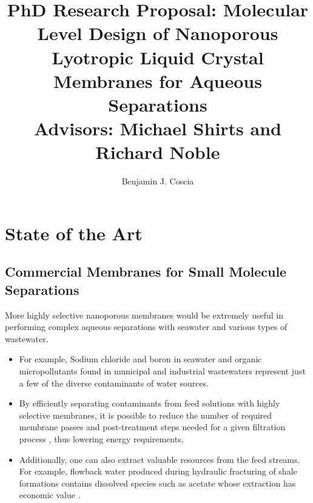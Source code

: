 \documentclass{article}
\title{PhD Research Proposal: Molecular Level Design of Nanoporous Lyotropic Liquid
Crystal Membranes for Aqueous Separations \\ \vspace{0.5cm}
\large Advisors: Michael Shirts and Richard Noble}
\author{Benjamin J. Coscia}
\begin{document}
  \maketitle
  \thispagestyle{empty}
  \clearpage
  \setcounter{page}{1} %

  \section{State of the Art}\label{section:state-of-the-art}

  \subsection*{Commercial Membranes for Small Molecule Separations}
  
  
  More highly selective nanoporous membranes would be extremely useful
  in performing complex aqueous separations with seawater and various
  types of wastewater.
  \begin{itemize}
    \item For example, Sodium chloride and boron in seawater 
    \cite{fritzmann_state---art_2007} and organic micropollutants found in
    municipal and industrial wastewaters \cite{schwarzenbach_challenge_2006}
    represent just a few of the diverse contaminants of water sources. 
    \item By efficiently separating contaminants from feed solutions with
    highly selective membranes, it is possible to reduce the number of 
    required membrane passes and post-treatment steps needed for a given 
    filtration process \cite{werber_materials_2016}, thus lowering energy
    requirements. 
    \item Additionally, one can also extract valuable resources from the 
    feed streams. For example, flowback water produced during hydraulic
    fracturing of shale formations contains dissolved species such as acetate
    whose extraction has economic value \cite{dischinger_application_2017}.
  \end{itemize}
\end{document}
